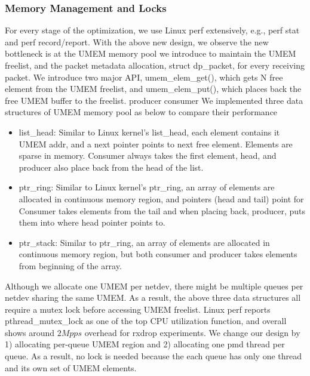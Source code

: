 \documentclass[10pt]{sigplanconf}
\begin{document}
\subsubsection{Memory Management and Locks}
For every stage of the optimization, we use Linux perf extensively, e.g., perf stat
and perf record/report.  With the above new design, we observe the new bottleneck
is at the UMEM memory pool we introduce to maintain the UMEM freelist, and the
packet metadata allocation, struct dp\_packet, for every receiving packet.
We introduce two major API, umem\_elem\_get(), which gets N free element from the
UMEM freelist, and umem\_elem\_put(), which places back the free UMEM buffer to
the freelist.
producer 
consumer
We implemented three data structures of UMEM memory pool as below
to compare their performance
\begin{itemize}
\item list\_head: Similar to Linux kernel's list\_head, each element contains it
UMEM addr, and a next pointer points to next free element. Elements are sparse in
memory. Consumer always takes the first element, head, and producer also place back
from the head of the list.
\item ptr\_ring: Similar to Linux kernel's ptr\_ring, an array of elements are
allocated in continuous memory region, and pointers (head and tail) point for
Consumer takes elements from the tail and when placing back, producer, puts
them into where head pointer points to.
\item ptr\_stack: Similar to ptr\_ring, an array of elements are allocated
in continuous memory region, but both consumer and producer takes elements
from beginning of the array.
\end{itemize}

Although we allocate one UMEM per netdev, there might be multiple queues per
netdev sharing the same UMEM. As a result, the above three data structures
all require a mutex lock before accessing UMEM freelist. Linux perf reports
pthread\_mutex\_lock as one of the top CPU utilization function, and overall
shows around $2Mpps$ overhead for rxdrop experiments.
We change our design by 1) allocating per-queue UMEM region and 2)
allocating one pmd thread per queue. As a result, no lock is needed because
the each queue has only one thread and its own set of UMEM elements.
\end{document}
